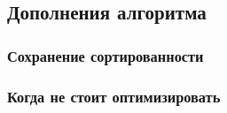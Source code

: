 \subsection{Дополнения алгоритма}

\subsubsection{Сохранение сортированности}

\newpage
\subsubsection{Когда не стоит оптимизировать}
